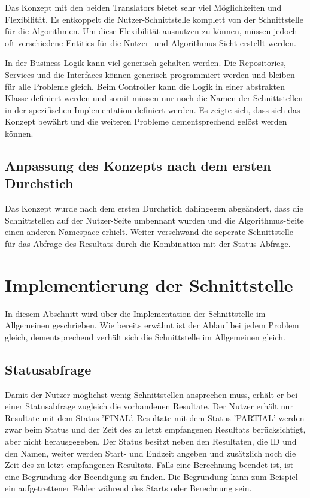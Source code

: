 Das Konzept mit den beiden Translators bietet sehr viel Möglichkeiten und Flexibilität. Es entkoppelt die Nutzer-Schnittstelle komplett von der Schnittstelle für die Algorithmen. Um diese 
Flexibilität ausnutzen zu können, müssen jedoch oft verschiedene Entities für die Nutzer- und Algorithmus-Sicht erstellt werden.

In der Business Logik kann viel generisch gehalten werden. Die Repositories, Services und die Interfaces können generisch programmiert werden und bleiben für alle Probleme gleich. Beim 
Controller kann die Logik in einer abstrakten Klasse definiert werden und somit müssen nur noch die Namen der Schnittstellen in der spezifischen Implementation definiert werden. Es zeigte sich, 
dass sich das Konzept bewährt und die weiteren Probleme dementsprechend gelöst werden können.

\subsection{Anpassung des Konzepts nach dem ersten Durchstich}\label{doings_prototyp}
Das Konzept wurde nach dem ersten Durchstich dahingegen abgeändert, dass die Schnittstellen auf der Nutzer-Seite umbennant wurden und die Algorithmus-Seite einen anderen Namespace 
erhielt. Weiter verschwand die seperate Schnittstelle für das Abfrage des Resultats durch die Kombination mit der Status-Abfrage.

\section{Implementierung der Schnittstelle}\label{impl_interface}
In diesem Abschnitt wird über die Implementation der Schnittstelle im Allgemeinen geschrieben. Wie bereits erwähnt ist der Ablauf bei jedem Problem gleich, dementsprechend verhält sich die 
Schnittstelle im Allgemeinen gleich.

\subsection{Statusabfrage}
Damit der Nutzer möglichst wenig Schnittstellen ansprechen muss, erhält er bei einer Statusabfrage zugleich die vorhandenen Resultate. Der Nutzer erhält nur Resultate mit dem Status 'FINAL'. 
Resultate mit dem Status 'PARTIAL' werden zwar beim Status und der Zeit des zu letzt empfangenen Resultats berücksichtigt, aber nicht herausgegeben. Der Status besitzt neben den 
Resultaten, die ID und den Namen, weiter werden Start- und Endzeit angeben und zusätzlich noch die Zeit des zu letzt empfangenen Resultats. Falls eine Berechnung beendet ist, ist eine 
Begründung der Beendigung zu finden. Die Begründung kann zum Beispiel ein aufgetrettener Fehler während des Starts oder Berechnung sein.

